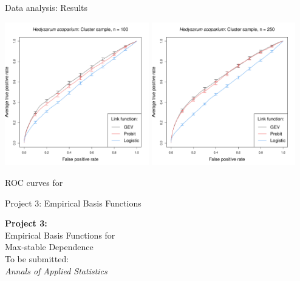 \documentclass{beamer}
\begin{document}
\begin{frame}{Data analysis: Results}
	\begin{center}
		\includegraphics[width=0.47\textwidth]{data-perf-species2-100-clu}
		\includegraphics[width=0.47\textwidth]{data-perf-species2-250-clu}
		
		ROC curves for \hedysarum{}
	\end{center}
\end{frame}

\begin{frame}{Project 3: Empirical Basis Functions}
	\begin{center}
		\LARGE
		\textbf{Project 3:}\\ [1em]
		Empirical Basis Functions for \\
		Max-stable Dependence\\ [2em]
		\normalsize
		To be submitted:\\
		\emph{Annals of Applied Statistics}
	\end{center}
\end{frame}
\end{document}
